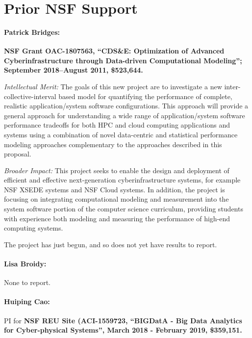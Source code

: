 \section{Prior NSF Support}
\label{sec:prior}

\paragraph{Patrick Bridges:}
\textbf{NSF Grant OAC-1807563, ``CDS\&E: Optimization of Advanced Cyberinfrastructure through Data-driven Computational Modeling''; September 2018--August 2011, \$523,644.}

\noindent\textit{Intellectual Merit:} The goals of this new project are to investigate a new inter-collective-interval based model for quantifying the performance of complete, realistic application/system software configurations. This approach will provide a general approach for understanding a wide range of application/system software performance tradeoffs for both HPC and cloud computing applications and systems using a combination of novel data-centric and statistical performance modeling approaches complementary to the approaches described in this proposal.

\noindent\textit{Broader Impact:} This project seeks to enable the design and deployment of efficient and effective next-generation cyberinfrastructure systems, for example NSF XSEDE systems and NSF Cloud systems. In addition, the project is focusing on integrating computational modeling and measurement into the system software portion of the computer science curriculum, providing students with experience both modeling and measuring the performance of high-end computing systems. 

\noindent The project has just begun, and so does not yet have results to report.

\paragraph{Lisa Broidy:} None to report.

\paragraph{Huiping Cao:} 
PI for {\bf NSF REU Site (ACI-1559723, ``BIGDatA - Big Data Analytics for Cyber-physical Systems'', %
March 2018 - February 2019, \$359,151.  } 

